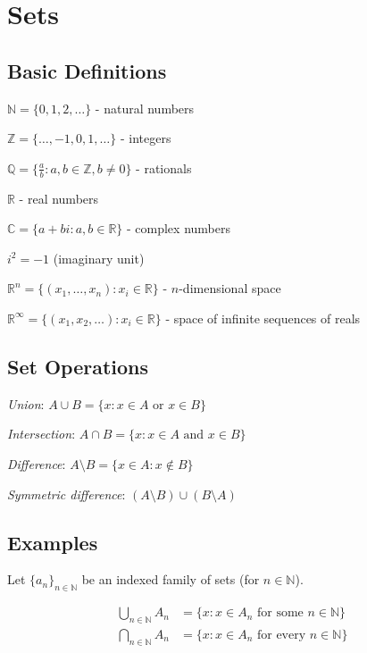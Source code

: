 \documentclass[12pt,a4paper]{article}
\begin{document}
\section{Sets}

\subsection{Basic Definitions}

$\mathbb{N} = \{0,1,2,\ldots\}$ - natural numbers

$\mathbb{Z} = \{\ldots,-1,0,1,\ldots\}$ - integers

$\mathbb{Q} = \{\frac{a}{b} : a,b \in \mathbb{Z}, b \neq 0\}$ - rationals

$\mathbb{R}$ - real numbers

$\mathbb{C} = \{a+bi : a,b \in \mathbb{R}\}$ - complex numbers

$i^2 = -1$ (imaginary unit)

$\mathbb{R}^n = \{(x_1,\ldots,x_n) : x_i \in \mathbb{R}\}$ - $n$-dimensional space

$\mathbb{R}^\infty = \{(x_1,x_2,\ldots) : x_i \in \mathbb{R}\}$ - space of infinite sequences of reals

\subsection{Set Operations}

\textit{Union}: $A \cup B = \{x : x \in A \text{ or } x \in B\}$

\textit{Intersection}: $A \cap B = \{x : x \in A \text{ and } x \in B\}$

\textit{Difference}: $A \setminus B = \{x \in A : x \notin B\}$

\textit{Symmetric difference}: $(A \setminus B) \cup (B \setminus A)$

\subsection{Examples}

Let $\{a_n\}_{n \in \mathbb{N}}$ be an indexed family of sets (for $n \in \mathbb{N}$).

\begin{align*}
\bigcup_{n \in \mathbb{N}} A_n &= \{x : x \in A_n \text{ for some } n \in \mathbb{N}\} \\
\bigcap_{n \in \mathbb{N}} A_n &= \{x : x \in A_n \text{ for every } n \in \mathbb{N}\}
\end{align*}
\end{document}
